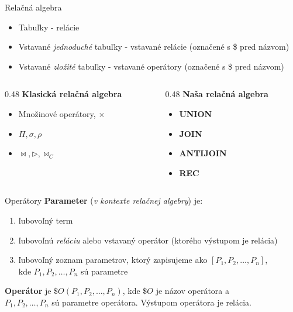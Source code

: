 \documentclass[11pt,aspectratio=169]{beamer}
\newcommand{\UNION}{\textbf{UNION}} \newcommand{\JOIN}{\textbf{JOIN}}
\newcommand{\ANTIJOIN}{\textbf{ANTIJOIN}} \newcommand{\REC}{\textbf{REC}}
\newcommand{\antijoin}{\mathbin{\triangleright}}
\begin{document}
\begin{frame}{Relačná algebra}
    \begin{itemize}
        \item Tabuľky - relácie
        \item Vstavané \textit{jednoduché} tabuľky - vstavané relácie (označené s \$ pred názvom)
        \item Vstavané \textit{zložité} tabuľky - vstavané operátory (označené s \$ pred názvom)
    \end{itemize}
    
    \begin{columns}[T,onlytextwidth]
        \begin{column}{0.48\textwidth}
            \textbf{Klasická relačná algebra}
            \begin{itemize}
                \item Množinové operátory, $\times$
                \item $\Pi, \sigma, \rho$
                \item $\Join, \antijoin, \Join_{C}$
            \end{itemize}
        \end{column}
        \begin{column}{0.48\textwidth}
            \textbf{Naša relačná algebra}
            \begin{itemize}
                \item \UNION
                \item \JOIN
                \item \ANTIJOIN
                \item \REC
            \end{itemize}
        \end{column}
    \end{columns}

\end{frame}

\begin{frame}{Operátory}
    \textbf{Parameter} (\textit{v kontexte relačnej algebry}) je:
    \begin{enumerate}
        \item ľubovoľný term
        \item ľubovoľnú \textit{reláciu} alebo vstavaný operátor (ktorého výstupom je relácia)
        \item ľubovoľný zoznam parametrov, ktorý zapisujeme ako $[P_1, P_2, \dots, P_n]$,\\ kde
        $P_1, P_2, \dots, P_n$ sú parametre
    \end{enumerate}
    
    \medskip
    
    \textbf{Operátor} je $\$O(P_1, P_2, \dots, P_n)$, kde $\$O$ je názov operátora a\\
    $P_1, P_2, \dots, P_n$ sú parametre operátora. Výstupom operátora je relácia.
\end{frame}
\end{document}
